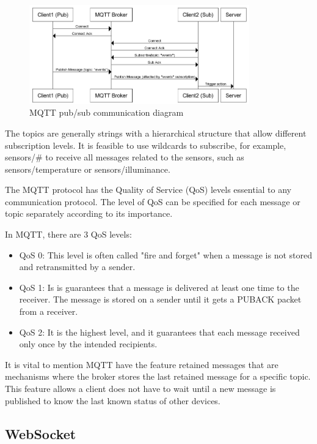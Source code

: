 \begin{figure}[H]
	\centering
	\includegraphics[width=0.85\textwidth]{img/MQTT_pub_sub_communication_diagram.png}
	\caption{MQTT pub/sub communication diagram}
	\label{fig:MQTT_pub_sub_communication_diagram}
  \end{figure}

The topics are generally strings with a hierarchical structure that allow different subscription levels. It is feasible to use wildcards to subscribe, for example, sensors/\# to receive all messages related to the sensors, such as sensors/temperature or sensors/illuminance.

The MQTT protocol has the Quality of Service (QoS) levels essential to any communication protocol.  The level of QoS can be specified for each message or topic separately according to its importance.

In MQTT, there are 3 QoS levels:

\begin{itemize}
	\item QoS 0: This level is often called "fire and forget" when a message is not stored and retransmitted by a sender.
	\item QoS 1: Is is guarantees that a message is delivered at least one time to the receiver. The message is stored on a sender until it gets a PUBACK packet from a receiver.
	\item QoS 2: It is the highest level, and it guarantees that each message received only once by the intended recipients.
\end{itemize}

It is vital to mention MQTT have the feature retained messages that are mechanisms where the broker stores the last retained message for a specific topic. This feature allows a client does not have to wait until a new message is published to know the last known status of other devices.
 
\subsection{WebSocket}
 
